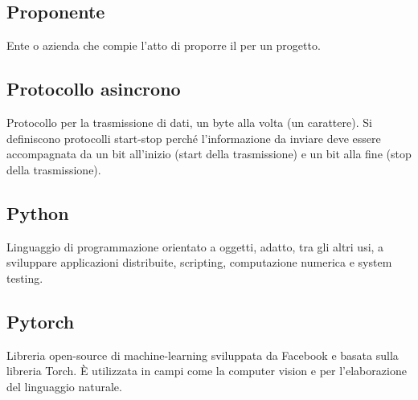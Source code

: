 \subsection*{Proponente}
Ente o azienda che compie l’atto di proporre il  per un progetto.

\subsection*{Protocollo asincrono}
Protocollo per la trasmissione di dati, un byte alla volta (un carattere). Si definiscono protocolli start-stop perché l'informazione da inviare deve essere accompagnata da un bit all'inizio (start della trasmissione) e un bit alla fine (stop della trasmissione).

\subsection*{Python}
Linguaggio di programmazione orientato a oggetti, adatto, tra gli altri usi, a sviluppare applicazioni distribuite, scripting, computazione numerica e system testing.

\subsection*{Pytorch}
Libreria open-source di machine-learning sviluppata da Facebook e basata sulla libreria Torch. È utilizzata in campi come la computer vision e per l'elaborazione del linguaggio naturale.

